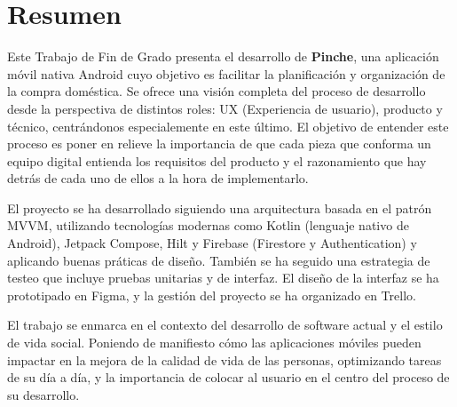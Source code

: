 \chapter*{Resumen}

Este Trabajo de Fin de Grado presenta el desarrollo de \textbf{Pinche}, una aplicación móvil nativa Android cuyo objetivo es facilitar la planificación y organización de la compra doméstica. Se ofrece una visión completa del proceso de desarrollo desde la perspectiva de distintos roles: UX (Experiencia de usuario), producto y técnico, centrándonos especialemente en este último. El objetivo de entender este proceso es poner en relieve la importancia de que cada pieza que conforma un equipo digital entienda los requisitos del producto y el razonamiento que hay detrás de cada uno de ellos a la hora de implementarlo.

El proyecto se ha desarrollado siguiendo una arquitectura basada en el patrón MVVM, utilizando tecnologías modernas como Kotlin (lenguaje nativo de Android), Jetpack Compose, Hilt y Firebase (Firestore y Authentication) y aplicando buenas práticas de diseño. También se ha seguido una estrategia de testeo que incluye pruebas unitarias y de interfaz. El diseño de la interfaz se ha prototipado en Figma, y la gestión del proyecto se ha organizado en Trello.

El trabajo se enmarca en el contexto del desarrollo de software actual y el estilo de vida social. Poniendo de manifiesto cómo las aplicaciones móviles pueden impactar en la mejora de la calidad de vida de las personas, optimizando tareas de su día a día, y la importancia de colocar al usuario en el centro del proceso de su desarrollo.
